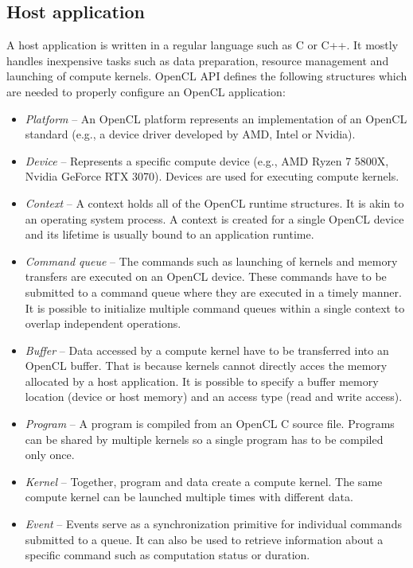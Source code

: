 \documentclass[
  digital,     %
  oneside,     %
  nosansbold,  %
  nocolorbold, %
  lof,         %
  lot,         %
]{fithesis4}
\begin{document}
\subsection{Host application}
A host application is written in a regular language such as C or C++. It mostly handles inexpensive tasks such as data preparation, resource management and launching of compute kernels. OpenCL API defines the following structures which are needed to properly configure an OpenCL application:
\begin{itemize}
    \item \textit{Platform} -- An OpenCL platform represents an implementation of an OpenCL standard (e.g., a device driver developed by AMD, Intel or Nvidia).
    \item \textit{Device} -- Represents a specific compute device (e.g., AMD Ryzen 7 5800X, Nvidia GeForce RTX 3070). Devices are used for executing compute kernels.
    \item \textit{Context} -- A context holds all of the OpenCL runtime structures. It is akin to an operating system process. A context is created for a single OpenCL device and its lifetime is usually bound to an application runtime.
    \item \textit{Command queue} -- The commands such as launching of kernels and memory transfers are executed on an OpenCL device. These commands have to be submitted to a command queue where they are executed in a timely manner. It is possible to initialize multiple command queues within a single context to overlap independent operations.
    \item \textit{Buffer} -- Data accessed by a compute kernel have to be transferred into an OpenCL buffer. That is because kernels cannot directly acces the memory allocated by a host application. It is possible to specify a buffer memory location (device or host memory) and an access type (read and write access).
    \item \textit{Program} -- A program is compiled from an OpenCL C source file. Programs can be shared by multiple kernels so a single program has to be compiled only once.
    \item \textit{Kernel} -- Together, program and data create a compute kernel. The same compute kernel can be launched multiple times with different data.
    \item \textit{Event} -- Events serve as a synchronization primitive for individual commands submitted to a queue. It can also be used to retrieve information about a specific command such as computation status or duration.
\end{itemize}
\end{document}
